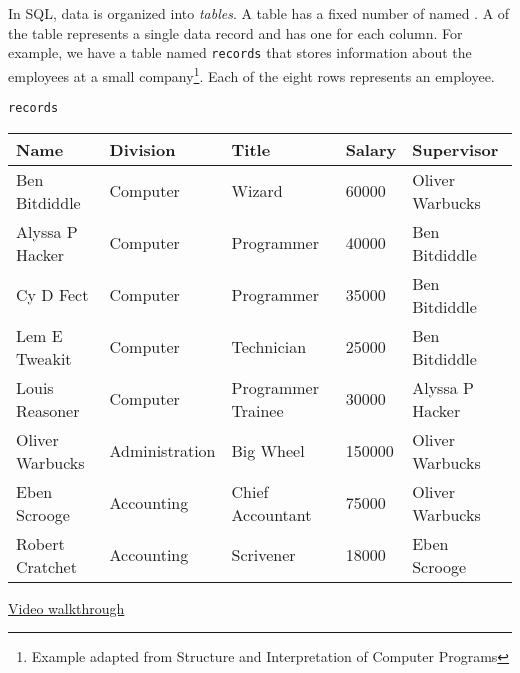 In SQL, data is organized into \textit{tables}.  A table has a fixed number of
named . A  of the table represents a single data
record and has one  for each column.  For example, we have a table
named \texttt{records} that stores information about the employees at a small
company\footnote{Example adapted from Structure and Interpretation of Computer
Programs}. Each of the eight rows represents an employee.


\begin{center}
    \texttt{records}\\
    \begin{tabular}{ l l l l l }
        \textbf{Name} & \textbf{Division} & \textbf{Title} & \textbf{Salary} & \textbf{Supervisor} \\
        \hline
        Ben Bitdiddle   &  Computer       & Wizard             & 60000  & Oliver Warbucks \\
        Alyssa P Hacker &  Computer       & Programmer         & 40000  & Ben Bitdiddle   \\
        Cy D Fect       &  Computer       & Programmer         & 35000  & Ben Bitdiddle   \\
        Lem E Tweakit   &  Computer       & Technician         & 25000  & Ben Bitdiddle   \\
        Louis Reasoner  &  Computer       & Programmer Trainee & 30000  & Alyssa P Hacker \\
        Oliver Warbucks &  Administration & Big Wheel          & 150000 & Oliver Warbucks \\
        Eben Scrooge    &  Accounting     & Chief Accountant   & 75000  & Oliver Warbucks \\
        Robert Cratchet &  Accounting     & Scrivener          & 18000  & Eben Scrooge
    \end{tabular}
\end{center}

\begin{solution}[0.1in]
\href{https://youtu.be/OyTnjS94EE8}{Video walkthrough}
\end{solution}
